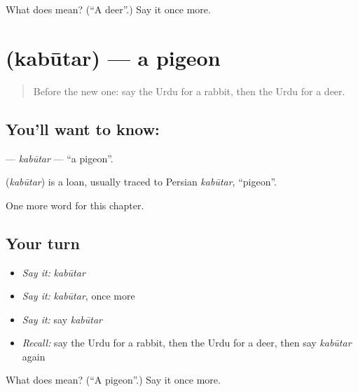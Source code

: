 \begin{tcolorbox}[breakable,colback=teal!4,colframe=teal!35!black,title={Before you move on}]
What does  mean? (\textquotedblleft{}A deer\textquotedblright{}.) Say it once more.
\end{tcolorbox}
\section[\texorpdfstring{\ur{کبوتر} (kabūtar)}{کبوتر (kabūtar)}]{ (kabūtar) — a pigeon}

\label{lesson:UR-C128-kabutar}



\begin{quote}
Before the new one: say the Urdu for a rabbit, then the Urdu for a deer.
\end{quote}

\subsection*{You'll want to know: }
\textbf{} — \emph{kabūtar} — \textquotedblleft{}a pigeon\textquotedblright{}.

\begin{cousinweb}
\textbf{} (\emph{kabūtar}) is a loan, usually traced to Persian \emph{kabūtar}, \textquotedblleft{}pigeon\textquotedblright{}.
\end{cousinweb}

\begin{grammarlens}[title={What you've built}]
One more word for this chapter.
\end{grammarlens}

\subsection*{Your turn}
\begin{itemize}
\raggedright
  \item \emph{Say it:} \emph{kabūtar}
  \item \emph{Say it:} \emph{kabūtar}, once more
  \item \emph{Say it:} say \emph{kabūtar}
  \item \emph{Recall:} say the Urdu for a rabbit, then the Urdu for a deer, then say \emph{kabūtar} again
\end{itemize}

\begin{tcolorbox}[breakable,colback=teal!4,colframe=teal!35!black,title={Before you move on}]
What does  mean? (\textquotedblleft{}A pigeon\textquotedblright{}.) Say it once more.
\end{tcolorbox}
